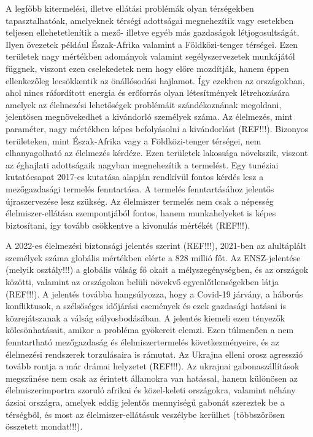 \documentclass[a4paper,oneside,onecolumn,12pt]{LegrandOrangeBook}
\begin{document}
	A legfőbb kitermelési, illetve ellátási problémák olyan térségekben tapasztalhatóak, amelyeknek térségi adottságai megnehezítik vagy esetekben teljesen ellehetetlenítik a mező- illetve egyéb más gazdaságok létjogosultságát. Ilyen övezetek például Észak-Afrika valamint a Földközi-tenger térségei. Ezen területek nagy mértékben adományok valamint segélyszervezetek munkájától  függnek, viszont ezen cselekedetek nem hogy előre mozdítják, hanem éppen ellenkezőleg lecsökkentik az önállósodási hajlamot. Így ezekben az országokban, ahol nincs ráfordított energia és erőforrás olyan létesítmények létrehozására amelyek az élelmezési lehetőségek problémáit szándékoznának megoldani, jelentősen megnövekedhet a kivándorló személyek száma. Az élelmezés, mint paraméter, nagy mértékben képes befolyásolni a kivándorlást (REF!!!). Bizonyos területeken, mint Észak-Afrika vagy a Földközi-tenger térségei, nem elhanyagolható az élelmezés kérdéze. Ezen területek lakossága növekszik, viszont az éghajlati adottságaik nagyban megnehezítik a termelést. Egy tunéziai kutatócsapat 2017-es kutatása alapján rendkívül fontos kérdés lesz a mezőgazdasági termelés fenntartása. A termelés fenntartásához jelentős újraszervezése lesz szükség. Az élelmiszer termelés nem csak a népesség élelmiszer-ellátása szempontjából fontos, hanem munkahelyeket is képes biztosítani, így tovább csökkentve a kivonulás mértékét (REF!!!).

	A 2022-es élelmezési biztonsági jelentés szerint (REF!!!), 2021-ben az alultáplált személyek száma globális mértékben elérte a 828 millió főt. Az ENSZ-jelentése (melyik osztály!!!) a globális válság fő okait a mélyszegénységben, és az országok közötti, valamint az országokon belüli növekvő egyenlőtlenségekben látja (REF!!!). A jelentés továbba hangsúlyozza, hogy a Covid-19 járvány, a háborús konfliktusok, a szélsőséges időjárási események és ezek gazdasági hatásai is közrejátszanak a válság súlyosbodásában. A jelentés kiemeli ezen tényezők kölcsönhatásait, amikor a probléma gyökereit elemzi. Ezen túlmenően a nem fenntartható mezőgazdaság és élelmiszertermelés következményeire, és az élelmezési rendszerek torzulásaira is rámutat. Az Ukrajna elleni orosz agresszió tovább rontja a már drámai helyzetet (REF!!!). Az ukrajnai gabonaszállítások megszűnése nem csak az érintett államokra van hatással, hanem különösen az élelmiszerimportra szoruló afrikai és közel-keleti országokra, valamint néhány ázsiai országra, amelyek eddig jelentős mennyiségű gabonát szereztek be a térségből, és most az élelmiszer-ellátásuk veszélybe kerülhet (többszörösen összetett mondat!!!).
\end{document}
